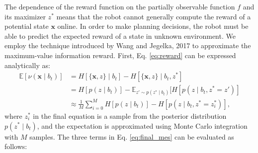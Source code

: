 \documentclass{styles/svproc}
\newcommand{\x}{\mathbf{x}}
\begin{document}
The dependence of the reward function on the partially observable function $f$ and its maximizer $z^*$  means that the robot cannot generally compute the reward of a potential state $\x$ online. In order to make planning decisions, the robot must be able to predict the expected reward of a state in unknown environment. %
We employ the technique introduced by Wang and Jegelka, 2017 \cite{wang2017max} to approximate the maximum-value information reward. First, Eq. \ref{eq:reward} can be expressed analytically as:
\begin{align}
    \mathbb{E}[\nu(\x \mid  b_t)]  & = H[ \{\x, z\} \mid  b_t] - H[ \{\x, z\} \mid  b_t, z^*] \\    & = H[{p}(z \mid  b_t)] - \mathbb{E}_{z' \sim {p}(z^* \mid b_t)} [H[{p}(z \mid  b_t, z^* = z')] \\
    & \approx \frac{1}{M} \sum_{i = 0}^M  H[{p}(z \mid  b_t)] - H[{p}(z \mid  b_t, z^* = z^*_i)],
    \label{eq:final_mes}
\end{align}
where $z^*_i$ in the final equation is a sample from the posterior distribution $p(z^* \mid b_t)$, and the expectation is approximated using Monte Carlo integration with $M$ samples. The three terms in Eq. \ref{eq:final_mes} can be evaluated as follows: 
\end{document}

